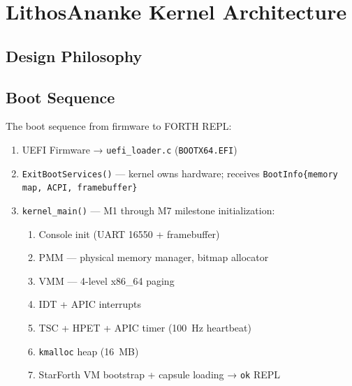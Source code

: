 
\chapter{LithosAnanke Kernel Architecture}
\label{vol2:chap:kernel}


\section{Design Philosophy}
\label{vol2:sec:kernel:philosophy}


\section{Boot Sequence}
\label{vol2:sec:kernel:boot}


The boot sequence from firmware to FORTH REPL:

\begin{enumerate}
  \item UEFI Firmware → \texttt{uefi\_loader.c} (\texttt{BOOTX64.EFI})
  \item \texttt{ExitBootServices()} — kernel owns hardware; receives
        \texttt{BootInfo\{memory map, ACPI, framebuffer\}}
  \item \texttt{kernel\_main()} — M1 through M7 milestone initialization:
    \begin{enumerate}
      \item[M1] Console init (UART 16550 + framebuffer)
      \item[M2] PMM — physical memory manager, bitmap allocator
      \item[M3] VMM — 4-level x86\_64 paging
      \item[M4] IDT + APIC interrupts
      \item[M5] TSC + HPET + APIC timer (100~Hz heartbeat)
      \item[M6] \texttt{kmalloc} heap (16~MB)
      \item[M7] StarForth VM bootstrap + capsule loading → \texttt{ok} REPL
    \end{enumerate}
\end{enumerate}

